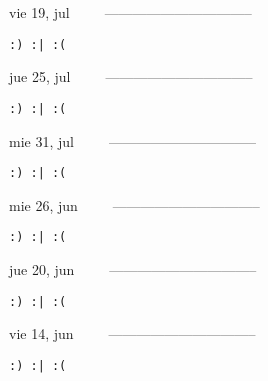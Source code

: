 \documentclass[letterpaper,10pt]{article}
\begin{document}
\begin{multicols}{3}
{vie 19, jul\ \ \ \ \ --------------------------------}
\begin{flushright}\begin{small}\texttt{:) :| :(}\end{small}\end{flushright}
\vfill
{jue 25, jul\ \ \ \ \ --------------------------------}
\begin{flushright}\begin{small}\texttt{:) :| :(}\end{small}\end{flushright}\par
\vfill
{mie 31, jul\ \ \ \ \ --------------------------------}
\begin{flushright}\begin{small}\texttt{:) :| :(}\end{small}\end{flushright}\par
\vfill
\end{multicols}
\vspace{1.05cm}

\begin{multicols}{3}
{mie 26, jun\ \ \ \ \ --------------------------------}
\begin{flushright}\begin{small}\texttt{:) :| :(}\end{small}\end{flushright}
\vfill
{jue 20, jun\ \ \ \ \ --------------------------------}
\begin{flushright}\begin{small}\texttt{:) :| :(}\end{small}\end{flushright}\par
\vfill
{vie 14, jun\ \ \ \ \ --------------------------------}
\begin{flushright}\begin{small}\texttt{:) :| :(}\end{small}\end{flushright}\par
\vfill
\end{multicols}
\vspace{1.05cm}
\end{document}

